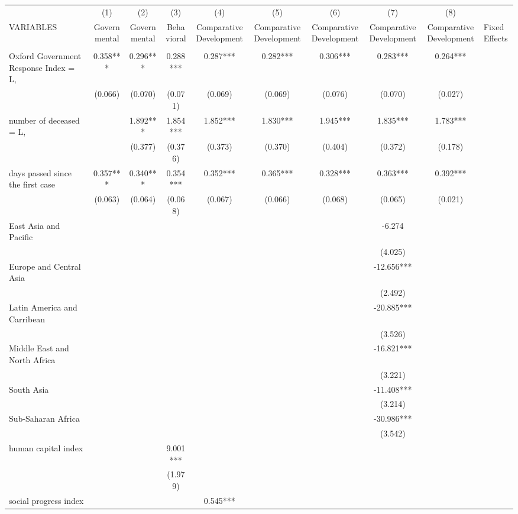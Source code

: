 \documentclass[]{article}
\begin{document}
\begin{tabular}{lcccccccc} \hline
 & (1) & (2) & (3) & (4) & (5) & (6) & (7) & (8) \\
VARIABLES & Governmental & Governmental & Behavioral & Comparative Development & Comparative Development & Comparative Development & Comparative Development & Comparative Development & Fixed Effects \\ \hline
 &  &  &  &  &  &  &  &  \\
Oxford Government Response Index = L, & 0.358*** & 0.296*** & 0.288*** & 0.287*** & 0.282*** & 0.306*** & 0.283*** & 0.264*** \\
 & (0.066) & (0.070) & (0.071) & (0.069) & (0.069) & (0.076) & (0.070) & (0.027) \\
number of deceased = L, &  & 1.892*** & 1.854*** & 1.852*** & 1.830*** & 1.945*** & 1.835*** & 1.783*** \\
 &  & (0.377) & (0.376) & (0.373) & (0.370) & (0.404) & (0.372) & (0.178) \\
days passed since the first case & 0.357*** & 0.340*** & 0.354*** & 0.352*** & 0.365*** & 0.328*** & 0.363*** & 0.392*** \\
 & (0.063) & (0.064) & (0.068) & (0.067) & (0.066) & (0.068) & (0.065) & (0.021) \\
East Asia and Pacific &  &  &  &  &  &  & -6.274 &  \\
 &  &  &  &  &  &  & (4.025) &  \\
Europe and Central Asia &  &  &  &  &  &  & -12.656*** &  \\
 &  &  &  &  &  &  & (2.492) &  \\
Latin America and Carribean &  &  &  &  &  &  & -20.885*** &  \\
 &  &  &  &  &  &  & (3.526) &  \\
Middle East and North Africa &  &  &  &  &  &  & -16.821*** &  \\
 &  &  &  &  &  &  & (3.221) &  \\
South Asia &  &  &  &  &  &  & -11.408*** &  \\
 &  &  &  &  &  &  & (3.214) &  \\
Sub-Saharan Africa &  &  &  &  &  &  & -30.986*** &  \\
 &  &  &  &  &  &  & (3.542) &  \\
human capital index &  &  & 9.001*** &  &  &  &  &  \\
 &  &  & (1.979) &  &  &  &  &  \\
social progress index &  &  &  & 0.545*** &  &  &  &  \\

\end{tabular}
\end{document}
